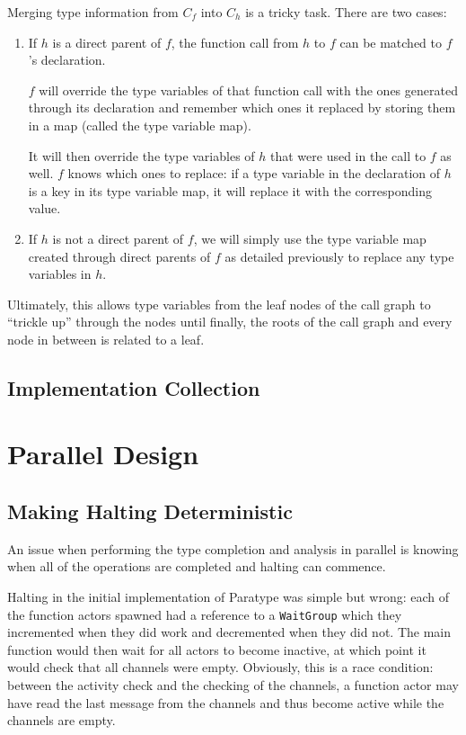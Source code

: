 \documentclass{acm_proc_article-sp}
\begin{document}
Merging type information from $C_f$ into $C_h$ is a tricky task. There are two
cases:
\begin{enumerate}
	\item If $h$ is a direct parent of $f$, the function call from $h$ to $f$
		can be matched to $f$'s declaration.

		$f$ will override the type
		variables of that function call with the ones generated through its
		declaration and remember which ones it replaced by storing them in a
		map (called the type variable map).

		It will then override the type variables of $h$ that were used in the
		call to $f$ as well. $f$ knows which ones to replace: if a type
		variable in the declaration of $h$ is a key in its type variable map,
		it will replace it with the corresponding value.
	\item If $h$ is not a direct parent of $f$, we will simply use the type
		variable map created through direct parents of $f$ as detailed
		previously to replace any type variables in $h$.
\end{enumerate}

Ultimately, this allows type variables from the leaf nodes of the call graph to
``trickle up'' through the nodes until finally, the roots of the call graph and
every node in between is related to a leaf.

\subsection{Implementation Collection}

\section{Parallel Design}
	\subsection{Making Halting Deterministic}
		\label{subsec:halting}

		An issue when performing the type completion and analysis in parallel
		is knowing when all of the operations are completed and halting can
		commence. 
		
		Halting in the initial implementation of Paratype was simple but wrong:
		each of the function actors spawned had a reference to a
		\texttt{WaitGroup} which they incremented when they did work and
		decremented when they did not. The main function would then wait for
		all actors to become inactive, at which point it would check that all
		channels were empty.  Obviously, this is a race condition: between the
		activity check and the checking of the channels, a function actor may
		have read the last message from the channels and thus become active
		while the channels are empty.
\end{document}
